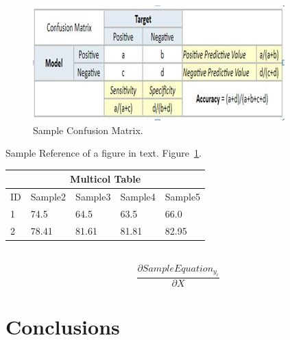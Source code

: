 \documentclass[10pt,twocolumn,letterpaper]{article}
\begin{document}
\begin{figure}
   \begin{center}
  \includegraphics[width=\linewidth]{ConfusionMatrix.JPG}
   \end{center}
   \caption{Sample Confusion Matrix.\cite{W1}
   \label{Img1}}
\end{figure} 
Sample Reference of a figure in text. Figure~\ref{Img1}.\\

\begin{tabular}{ |p{0.5cm}||p{1.4cm}|p{1.4cm}|p{1.4cm}|p{1.4cm}|  }
 \hline
 \multicolumn{5}{|c|}{Multicol Table} \\
 \hline
 ID & Sample2 & Sample3 & Sample4 & Sample5\\
 \hline
 1 & 74.5 & 64.5 & 63.5 & 66.0\\
 \hline
 2 & 78.41 & 81.61 & 81.81 & 82.95\\
 \hline
\end{tabular}\\

\begin{equation}
\frac{\partial Sample Equation_{y_i}}{\partial X}
\end{equation}

\section{Conclusions}
\appendix
{\small


}
\end{document}
